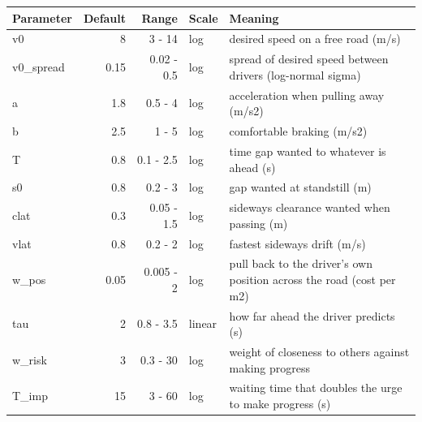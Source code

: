 \begin{tabular}{|l|r|r|l|p{6.5cm}|}
\hline
\textbf{Parameter} & \textbf{Default} & \textbf{Range} & \textbf{Scale} & \textbf{Meaning} \\
\hline
v0 & 8 & 3 - 14 & log & desired speed on a free road (m/s) \\
v0\_spread & 0.15 & 0.02 - 0.5 & log & spread of desired speed between drivers (log-normal sigma) \\
a & 1.8 & 0.5 - 4 & log & acceleration when pulling away (m/s2) \\
b & 2.5 & 1 - 5 & log & comfortable braking (m/s2) \\
T & 0.8 & 0.1 - 2.5 & log & time gap wanted to whatever is ahead (s) \\
s0 & 0.8 & 0.2 - 3 & log & gap wanted at standstill (m) \\
clat & 0.3 & 0.05 - 1.5 & log & sideways clearance wanted when passing (m) \\
vlat & 0.8 & 0.2 - 2 & log & fastest sideways drift (m/s) \\
w\_pos & 0.05 & 0.005 - 2 & log & pull back to the driver's own position across the road (cost per m2) \\
tau & 2 & 0.8 - 3.5 & linear & how far ahead the driver predicts (s) \\
w\_risk & 3 & 0.3 - 30 & log & weight of closeness to others against making progress \\
T\_imp & 15 & 3 - 60 & log & waiting time that doubles the urge to make progress (s) \\
\hline
\end{tabular}
